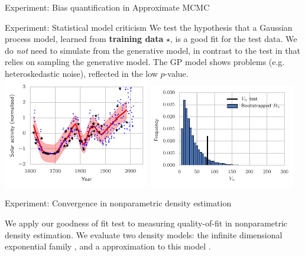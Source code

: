 \begin{frame}
\begin{columns}
\begin{column}{.32\linewidth}
\begin{block}{Experiment: Bias quantification in Approximate MCMC}
\end{block}
\vspace{-0.75cm}
\begin{block}{Experiment: Statistical model criticism}
We test the hypothesis that a Gaussian process {\color{red} model}, learned from \textbf{training data} $\star$,
is a good fit for the {\color{blue} test data}. We do {\em not} need to simulate from the generative model, in contrast to  the test in \cite{lloyd2015statistical} that relies on sampling the generative model. The GP model shows problems (e.g. heteroskedastic noise), reflected in the low $p$-value.
\includegraphics[width=0.48\textwidth]{../../presentation/img/gp_regression_data_fit.pdf} \includegraphics[width=0.48\textwidth]{../../presentation/img/gp_regression_bootstrap_hist} 
\begin{minipage}{.35\linewidth}

\end{minipage}
\end{block}

\vspace{-0.75cm}

\begin{block}{Experiment: Convergence in nonparametric density estimation}

 

We apply our goodness of fit test to measuring quality-of-fit in nonparametric density estimation. We evaluate two
density models: the infinite dimensional exponential family \cite{SriFukKumGreHyv14}, and a  approximation to this model \cite{strathmann2015gradient}.
% 


\end{block}
\end{column}
\end{columns}
\end{frame}
